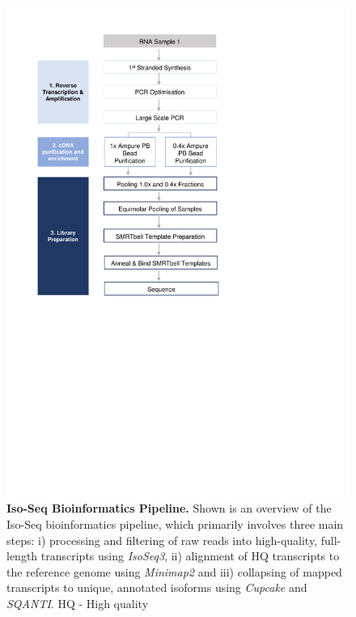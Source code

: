 \begin{figure}[]
	\centering
	\vspace{20pt}
	\includegraphics[page=17,trim={0 6cm 0 0},clip,scale = 0.8]{Figures/ProjectDevelopment_Figures.pdf}
	\captionsetup{width=0.95\textwidth}
	\caption[Iso-Seq Bioinformatics Pipeline]%
	{\textbf{Iso-Seq Bioinformatics Pipeline.} Shown is an overview of the Iso-Seq bioinformatics pipeline, which primarily involves three main steps: i) processing and filtering of raw reads into high-quality, full-length transcripts using \textit{IsoSeq3}, ii) alignment of HQ transcripts to the reference genome using \textit{Minimap2} and iii) collapsing of mapped transcripts to unique, annotated isoforms using \textit{Cupcake} and \textit{SQANTI}. HQ - High quality}
	\label{fig:isoseq_bioinformatics_Pipeline}
\end{figure}

